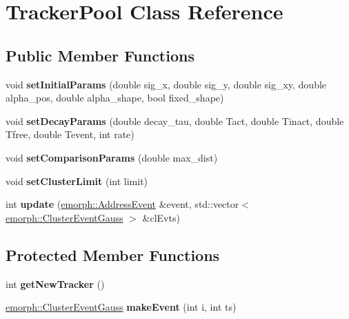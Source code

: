 \hypertarget{classTrackerPool}{\section{Tracker\-Pool Class Reference}
\label{classTrackerPool}
}
\subsection*{Public Member Functions}
\begin{DoxyCompactItemize}
\item 
\hypertarget{classTrackerPool_aba64099a18fc9b97eeb5b60f92ca849c}{void {\bfseries set\-Initial\-Params} (double sig\-\_\-x, double sig\-\_\-y, double sig\-\_\-xy, double alpha\-\_\-pos, double alpha\-\_\-shape, bool fixed\-\_\-shape)}\label{classTrackerPool_aba64099a18fc9b97eeb5b60f92ca849c}

\item 
\hypertarget{classTrackerPool_aacfd7b8d8f8d47cf609e6e4ed64bbc1a}{void {\bfseries set\-Decay\-Params} (double decay\-\_\-tau, double Tact, double Tinact, double Tfree, double Tevent, int rate)}\label{classTrackerPool_aacfd7b8d8f8d47cf609e6e4ed64bbc1a}

\item 
\hypertarget{classTrackerPool_a2ae5849c22bc24b688bd5ddf153e9e33}{void {\bfseries set\-Comparison\-Params} (double max\-\_\-dist)}\label{classTrackerPool_a2ae5849c22bc24b688bd5ddf153e9e33}

\item 
\hypertarget{classTrackerPool_a947f58bef9d46a290cb3ea6ec99d5fb8}{void {\bfseries set\-Cluster\-Limit} (int limit)}\label{classTrackerPool_a947f58bef9d46a290cb3ea6ec99d5fb8}

\item 
\hypertarget{classTrackerPool_af54f9236f7d525dde5a14fdee98f92c4}{int {\bfseries update} (\hyperlink{classemorph_1_1AddressEvent}{emorph\-::\-Address\-Event} \&event, std\-::vector$<$ \hyperlink{classemorph_1_1ClusterEventGauss}{emorph\-::\-Cluster\-Event\-Gauss} $>$ \&cl\-Evts)}\label{classTrackerPool_af54f9236f7d525dde5a14fdee98f92c4}

\end{DoxyCompactItemize}
\subsection*{Protected Member Functions}
\begin{DoxyCompactItemize}
\item 
\hypertarget{classTrackerPool_afc17f68023420c6d43ac4b67afa3b14d}{int {\bfseries get\-New\-Tracker} ()}\label{classTrackerPool_afc17f68023420c6d43ac4b67afa3b14d}

\item 
\hypertarget{classTrackerPool_a598259d38408ff2067da4235eab68f9d}{\hyperlink{classemorph_1_1ClusterEventGauss}{emorph\-::\-Cluster\-Event\-Gauss} {\bfseries make\-Event} (int i, int ts)}\label{classTrackerPool_a598259d38408ff2067da4235eab68f9d}

\end{DoxyCompactItemize}
